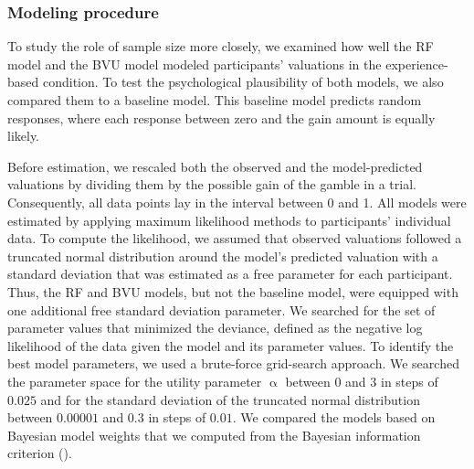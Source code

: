 \documentclass[a4paper,man, natbib]{apa6} %
\begin{document}
\subsubsection{Modeling procedure}
To study the role of sample size more closely, we examined how well the RF model and the BVU model modeled participants' valuations in the experience-based condition. To test the psychological plausibility of both models, we also compared them to a baseline model. This baseline model predicts random responses, where each response between zero and the gain amount is equally likely. 

Before estimation, we rescaled both the observed and the model-predicted valuations by dividing them by the possible gain of the gamble in a trial. Consequently, all data points lay in the interval between 0 and 1. All models were estimated by applying maximum likelihood methods to participants' individual data. To compute the likelihood, we assumed that observed valuations followed a truncated normal distribution around the model's predicted valuation with a standard deviation that was estimated as a free parameter for each participant. Thus, the RF and BVU models, but not the baseline model, were equipped with one additional free standard deviation parameter. We searched for the set of parameter values that minimized the deviance, defined as the negative log likelihood of the data given the model and its parameter values. To identify the best model parameters, we used a brute-force grid-search approach. We searched the parameter space for the utility parameter $\upalpha$ between $0$ and $3$ in steps of $0.025$ and for the standard deviation of the truncated normal distribution between $0.00001$ and $0.3$ in steps of $0.01$. We compared the models based on Bayesian model weights that we computed from the Bayesian information criterion (\citealp{Kass1995, Lewandowsky2011}).
\end{document}
